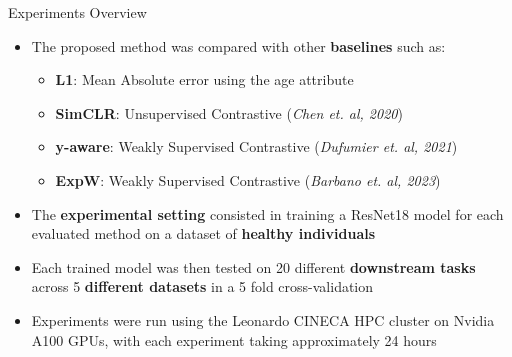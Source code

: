 \documentclass[12pt,aspectratio=169]{beamer}
\begin{document}
\begin{frame}{Experiments Overview}
\begin{itemize}
\item The proposed method was compared with other \textbf{baselines} such as:
\begin{itemize}
    \item \textbf{L1}: Mean Absolute error using the age attribute
    \item \textbf{SimCLR}: Unsupervised Contrastive (\emph{Chen et. al, 2020})
    \item \textbf{y-aware}: Weakly Supervised Contrastive (\emph{Dufumier et. al, 2021})
    \item \textbf{ExpW}: Weakly Supervised Contrastive (\emph{Barbano et. al, 2023})
\end{itemize}
\item The \textbf{experimental setting} consisted in training a ResNet18 model
for each evaluated method on a dataset of \textbf{healthy individuals}
\item Each trained model was then tested on 20 different \textbf{downstream
tasks} across 5 \textbf{different datasets} in a 5 fold cross-validation
\item Experiments were run using the Leonardo CINECA HPC cluster on Nvidia A100
GPUs, with each experiment taking approximately 24 hours
\end{itemize}
    
\end{frame}
\end{document}
